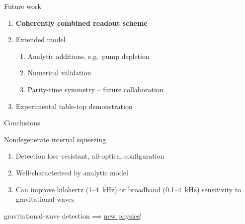 \documentclass[12pt,xcolor=dvipsnames]{beamer}
\newcommand{\vframefill}{\vskip0pt plus 1filll}
\begin{document}

\begin{frame}{Future work}
	\begin{enumerate}
	\item \textbf{Coherently combined readout scheme} %
	\item Extended model %
		\begin{enumerate}
		\item Analytic additions, e.g.\ pump depletion
		\item Numerical validation %
		\item Parity-time symmetry -- future collaboration
		\end{enumerate}
	\item Experimental table-top demonstration 
	\end{enumerate}
\end{frame}

\begin{frame}{Conclusions}
\begin{block}{Nondegenerate internal squeezing}
\begin{enumerate}
\item Detection loss--resistant, all-optical configuration
\item Well-characterised by analytic model
\item Can improve kilohertz (1--4~kHz) or broadband (0.1--4~kHz) sensitivity to gravitational waves 
\end{enumerate}
\end{block}
\vspace{0.5cm}
{
	\begin{block}{}
	\centering
	{\large gravitational-wave detection$\implies$\underline{new physics}!}
	\end{block}
}
\end{frame}
\end{document}
